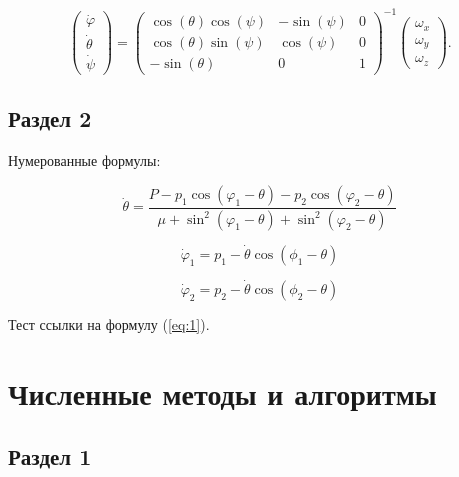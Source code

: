 \documentclass[a4paper,14pt]{extarticle}
\begin{document}
\begin{equation}
    \begin{pmatrix} \dot{\varphi}\\ \dot{\theta} \\ \dot{\psi} \end{pmatrix}
    = \begin{pmatrix}
        \cos(\theta)\cos(\psi) & -\sin(\psi) & 0 \\
        \cos(\theta)\sin(\psi) & \cos(\psi)  & 0 \\
        -\sin(\theta)         & 0         &  1
    \end{pmatrix}^{-1}
    \begin{pmatrix} \omega_x\\ \omega_y \\ \omega_z \end{pmatrix}. \nonumber
\end{equation}


\subsection{Раздел 2}

Нумерованные формулы:

\begin{equation}
\label{eq:1}
    \dot{\theta}=\frac{P-p_{1}\cos\left(\varphi_{1}-\theta\right)-p_{2}\cos\left(\varphi_{2}-\theta\right)}{\mu+\sin^{2}\left(\varphi_{1}-\theta\right)+\sin^{2}\left(\varphi_{2}-\theta\right)}
\end{equation}

\begin{equation}
    \dot{\varphi}_{1}=p_{1}-\dot{\theta}\cos(\phi_{1}-\theta)
\end{equation}

\begin{equation}
    \dot{\varphi}_{2}=p_{2}-\dot{\theta}\cos(\phi_{2}-\theta)
\end{equation}

Тест ссылки на формулу (\ref{eq:1}).

\pagebreak
\section{Численные методы и алгоритмы}

\subsection{Раздел 1}
\end{document}
